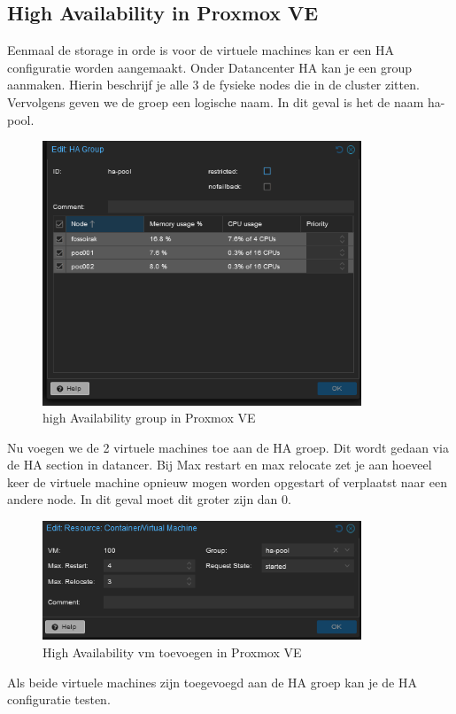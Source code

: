 \subsection{High Availability in Proxmox VE}

Eenmaal de storage in orde is voor de virtuele machines kan er een HA configuratie worden aangemaakt. 
Onder Datancenter HA kan je een group aanmaken. Hierin beschrijf je alle 3 de fysieke nodes die in de cluster zitten. Vervolgens geven we de groep een logische naam. In dit geval is het de naam ha-pool.
\begin{figure}[H]
  \centering
  \includegraphics[width=0.85\textwidth]{../poc/ha-group.png}
  \caption{high Availability group in Proxmox VE}
  \label{fig:ha-group}
\end{figure}
Nu voegen we de 2 virtuele machines toe aan de HA groep. Dit wordt gedaan via de HA section in datancer.
Bij Max restart en max relocate zet je aan hoeveel keer de virtuele machine opnieuw mogen worden opgestart of verplaatst naar een andere node. In dit geval moet dit groter zijn dan 0.
\begin{figure}[H]
  \centering
  \includegraphics[width=0.85\textwidth]{../poc/vm-ha.png}
  \caption{High Availability vm toevoegen in Proxmox VE}
  \label{fig:ha-vm}
\end{figure}
Als beide virtuele machines zijn toegevoegd aan de HA groep kan je de HA configuratie testen.

